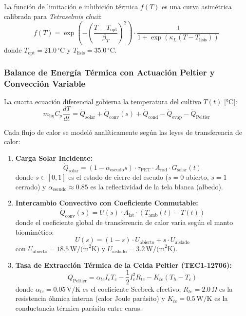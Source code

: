La función de limitación e inhibición térmica $f(T)$ es una curva asimétrica calibrada para \textit{Tetraselmis chuii}:
\begin{equation}
    f(T) = \exp \left( - \left( \frac{T - T_{\text{opt}}}{\beta_T} \right)^2 \right) \cdot \frac{1}{1 + \exp\left( \kappa_L (T - T_{\text{lisis}}) \right)}
\end{equation}
donde $T_{\text{opt}} = 21.0\,^\circ\text{C}$ y $T_{\text{lisis}} = 35.0\,^\circ\text{C}$.

\subsubsection{Balance de Energía Térmica con Actuación Peltier y Convección Variable}
La cuarta ecuación diferencial gobierna la temperatura del cultivo $T(t)$ [$\text{°C}$]:
\begin{equation}
    m_{\text{liq}} C_p \frac{dT}{dt} = \dot{Q}_{\text{solar}} + \dot{Q}_{\text{conv}}(s) + \dot{Q}_{\text{cond}} - \dot{Q}_{\text{evap}} - \dot{Q}_{\text{Peltier}} \label{eq:dt}
\end{equation}

Cada flujo de calor se modeló analíticamente según las leyes de transferencia de calor:
\begin{enumerate}
    \item \textbf{Carga Solar Incidente:}
    \begin{equation}
        \dot{Q}_{\text{solar}} = (1 - \alpha_{\text{escudo}} s) \cdot \tau_{\text{PET}} \cdot A_{\text{rad}} \cdot G_{\text{solar}}(t)
    \end{equation}
    donde $s \in [0, 1]$ es el estado de cierre del escudo ($s=0$ abierto, $s=1$ cerrado) y $\alpha_{\text{escudo}} \approx 0.85$ es la reflectividad de la tela blanca (albedo).
    
    \item \textbf{Intercambio Convectivo con Coeficiente Conmutable:}
    \begin{equation}
        \dot{Q}_{\text{conv}}(s) = U(s) \cdot A_{\text{lat}} \cdot \left( T_{\text{amb}}(t) - T(t) \right)
    \end{equation}
    donde el coeficiente global de transferencia de calor varía según el manto biomimético:
    \begin{equation}
        U(s) = (1 - s) \cdot U_{\text{abierto}} + s \cdot U_{\text{aislado}}
    \end{equation}
    con $U_{\text{abierto}} = 18.5\,\text{W/(m}^2\text{K)}$ y $U_{\text{aislado}} = 3.2\,\text{W/(m}^2\text{K)}$.
    
    \item \textbf{Tasa de Extracción Térmica de la Celda Peltier (TEC1-12706):}
    \begin{equation}
        \dot{Q}_{\text{Peltier}} = \alpha_{te} I_e T_c - \frac{1}{2} I_e^2 R_{te} - K_{te} (T_h - T_c)
    \end{equation}
    donde $\alpha_{te} = 0.05\,\text{V/K}$ es el coeficiente Seebeck efectivo, $R_{te} = 2.0\,\Omega$ es la resistencia óhmica interna (calor Joule parásito) y $K_{te} = 0.5\,\text{W/K}$ es la conductancia térmica parásita entre caras.
\end{enumerate}

